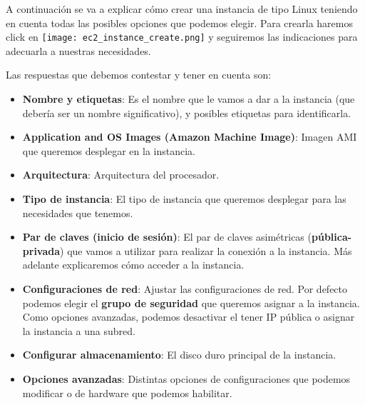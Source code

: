 A continuación se va a explicar cómo crear una instancia de tipo Linux teniendo en cuenta todas las posibles opciones que podemos elegir. Para crearla haremos click en \texttt{[image: ec2\_instance\_create.png]} y seguiremos las indicaciones para adecuarla a nuestras necesidades.

Las respuestas que debemos contestar y tener en cuenta son:

\begin{itemize}
	\item \textbf{Nombre y etiquetas}: Es el nombre que le vamos a dar a la instancia (que debería ser un nombre significativo), y posibles etiquetas para identificarla.
	
	\item \textbf{Application and OS Images (Amazon Machine Image)}: Imagen AMI que queremos desplegar en la instancia.
	
	\item \textbf{Arquitectura}: Arquitectura del procesador.
	
	\item \textbf{Tipo de instancia}: El tipo de instancia que queremos desplegar para las necesidades que tenemos.
	
	\item \textbf{Par de claves (inicio de sesión)}: El par de claves asimétricas (\textbf{pública-privada}) que vamos a utilizar para realizar la conexión a la instancia. Más adelante explicaremos cómo acceder a la instancia. 
	
	
	\item \textbf{Configuraciones de red}: Ajustar las configuraciones de red. Por defecto podemos elegir el \textbf{grupo de seguridad} que queremos asignar a la instancia. Como opciones avanzadas, podemos desactivar el tener IP pública o asignar la instancia a una subred.

	
	\item \textbf{Configurar almacenamiento}: El disco duro principal de la instancia.
	
	\item \textbf{Opciones avanzadas}: Distintas opciones de configuraciones que podemos modificar o de hardware que podemos habilitar.
\end{itemize}

